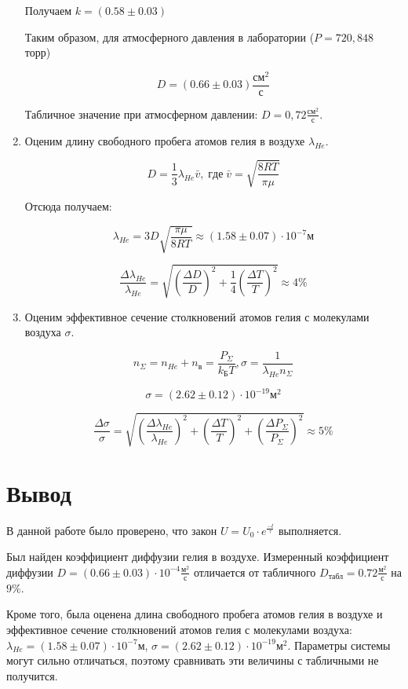 \documentclass[12pt,a4paper]{article}
\begin{document}
\begin{enumerate}
Получаем $k = (0.58 \pm 0.03)$

Таким образом, для атмосферного давления в лаборатории ($P = 720,848$ торр)

\[D = (0.66 \pm 0.03) \frac{\text{см}^2}{\text{с}}\]

Табличное значение при атмосферном давлении: $D = 0,72 \frac{см^2}{с}$.

\item Оценим длину свободного пробега атомов гелия в воздухе $\lambda_{He}$.
 
$$D = \frac{1}{3} \lambda_{He} \bar v,\; где\;  \bar v = \sqrt{\frac{8RT}{\pi \mu}}$$

Отсюда получаем: 

$$\lambda_{He} = 3D \sqrt{\frac{\pi \mu}{8RT}} \approx (1.58\pm 0.07)  \cdot 10^{-7} \text{м}$$ 

$$
\frac{\Delta \lambda_{He}}{\lambda_{He}} =\sqrt{\left(\frac{\Delta D}{D}\right)^2+\frac{1}{4}\left(\frac{\Delta T}{T}\right)^2} \approx 4\%
$$

\item Оценим эффективное сечение столкновений атомов гелия с молекулами воздуха $\sigma$.

$$n_{\Sigma} = n_{He} + n_{в} = \frac{P_{\Sigma}}{k_Б T}, \sigma = \frac{1}{\lambda_{He} n_\Sigma} $$

$$\sigma = (2.62 \pm 0.12) \cdot 10^{-19} м^2$$ 

$$
\frac{\Delta \sigma}{\sigma} = \sqrt{\left(\frac{\Delta \lambda_{He}}{\lambda_{He}}\right)^2+\left(\frac{\Delta T}{T}\right)^2+\left(\frac{\Delta P_\Sigma}{P_{\Sigma}}\right)^2} \approx 5\%
$$

\end{enumerate}


\section{Вывод}

В данной работе было проверено, что закон $U = U_0 \cdot e^{\frac{-t}{\tau}}$ выполняется.

Был найден коэффициент диффузии гелия в воздухе. Измеренный коэффициент диффузии $D = (0.66 \pm 0.03)\cdot 10^{-4} \frac{\text{м}^2}{\text{с}}$ отличается от табличного $D_\text{табл} = 0.72 \frac{\text{м}^2}{\text{с}}$ на $ 9\% $. 

Кроме того, была оценена длина свободного пробега атомов гелия в воздухе и эффективное сечение столкновений атомов гелия с молекулами воздуха: $\lambda_{He} = (1.58\pm 0.07)  \cdot 10^{-7} \text{м}$, $\sigma = (2.62 \pm 0.12) \cdot 10^{-19} м^2$. Параметры системы могут сильно отличаться, поэтому сравнивать эти величины с табличными не получится.
\end{document}
